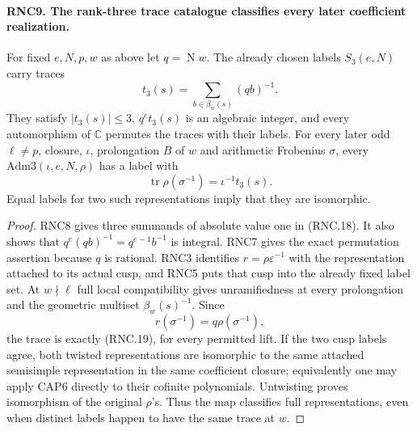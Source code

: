 \documentclass[11pt,a4paper]{article}
\numberwithin{equation}{section}
\theoremstyle{remark}\newtheorem{remark}[theorem]{Remark}
\begin{document}
\paragraph{RNC9. The rank-three trace catalogue classifies every later coefficient realization.}
\label{claim:RNC9}
For fixed $e,N,p,w$ as above let $q=\operatorname{N}w$.
The already chosen labels $S_3(e,N)$ carry traces
\[
                    t_3(s)=\sum_{b\in\beta_w(s)}(qb)^{-1}.
                                                               \tag{RNC.18}
\]
They satisfy $|t_3(s)|\leq3$, $q^e t_3(s)$ is an algebraic
integer, and every automorphism of $\mathbb C$ permutes
the traces with their labels.  For every later odd
$\ell\ne p$, closure, $\iota$, prolongation $B$ of $w$
and arithmetic Frobenius $\sigma$, every
$\mathrm{Adm3}(\iota,e,N,\rho)$ has a label with
\[
        \operatorname{tr}\rho(\sigma^{-1})=\iota^{-1}t_3(s).
                                                               \tag{RNC.19}
\]
Equal labels for two such representations imply that they
are isomorphic.
\begin{proof}
RNC8 gives three summands of absolute value one in
(RNC.18).  It also shows that
$q^e(qb)^{-1}=q^{e-1}b^{-1}$ is integral.  RNC7 gives
the exact permutation assertion because $q$ is rational.
RNC3 identifies $r=\rho\varepsilon^{-1}$ with the
representation attached to its actual cusp, and RNC5
puts that cusp into the already fixed label set.
At $w\nmid\ell$ full local compatibility gives
unramifiedness at every prolongation and the geometric
multiset $\beta_w(s)^{-1}$.  Since
\[
             r(\sigma^{-1})=q\rho(\sigma^{-1}),
                                                               \tag{RNC.20}
\]
the trace is exactly (RNC.19), for every permitted lift.
If the two cusp labels agree, both twisted representations
are isomorphic to the same attached semisimple
representation in the same coefficient closure; equivalently
one may apply CAP6 directly to their cofinite polynomials.
Untwisting proves isomorphism of the original $\rho$'s.
Thus the map classifies full representations, even when
distinct labels happen to have the same trace at $w$.
\end{proof}

\end{document}
